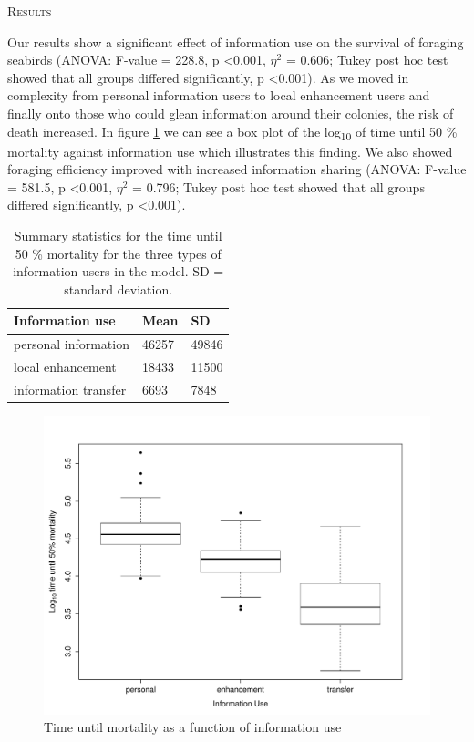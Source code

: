 \documentclass[12pt,letterpaper]{article}
\renewcommand{\section}[1]{%
\bigskip
\begin{center}
\begin{Large}
\normalfont\scshape #1
\medskip
\end{Large}
\end{center}}
\begin{document}
\section{Results}
Our results show a significant effect of information use on the survival of foraging seabirds (ANOVA: F-value = 228.8, p \textless 0.001, $\eta^2$ = 0.606; Tukey post hoc test showed that all groups differed significantly, p \textless 0.001). As we moved in complexity from personal information users to local enhancement users and finally onto those who could glean information around their colonies, the risk of death increased. In figure \ref{info.diff} we can see a box plot of the log\textsubscript{10} of time until 50 \% mortality against information use which illustrates this finding. We also showed foraging efficiency improved with increased information sharing (ANOVA: F-value = 581.5, p \textless 0.001, $\eta^2$ = 0.796; Tukey post hoc test showed that all groups differed significantly, p \textless 0.001). 

\begin{table}[]
\centering
\caption{Summary statistics for the time until 50 \% mortality for the three types of information users in the model. SD = standard deviation.}
\label{my-label}
\begin{tabular}{lll}
\hline 
\textbf{Information use} & \textbf{Mean} & \textbf{SD} \\
\hline 
personal information     & 46257         & 49846       \\
local enhancement   & 18433         & 11500       \\ 
information transfer      & 6693          & 7848       \\ 
\hline 

\end{tabular}
\end{table}



\begin{figure}[H]
\centering
    \includegraphics[keepaspectratio, totalheight=0.6 \textheight]{figure.pdf}
\caption{Time until mortality as a function of information use}
\label{info.diff}
\end{figure}
\end{document}
